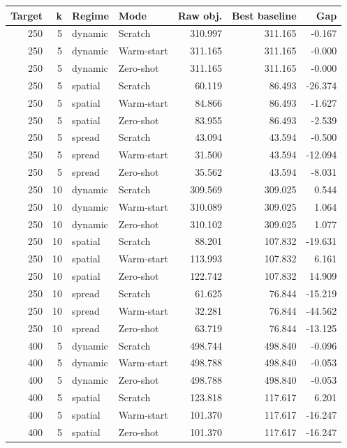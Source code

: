 \begin{tabular}{rrllrrr}
\toprule
Target & k & Regime & Mode & Raw obj. & Best baseline & Gap \\
\midrule
250 & 5 & dynamic & Scratch & 310.997 & 311.165 & -0.167 \\
250 & 5 & dynamic & Warm-start & 311.165 & 311.165 & -0.000 \\
250 & 5 & dynamic & Zero-shot & 311.165 & 311.165 & -0.000 \\
250 & 5 & spatial & Scratch & 60.119 & 86.493 & -26.374 \\
250 & 5 & spatial & Warm-start & 84.866 & 86.493 & -1.627 \\
250 & 5 & spatial & Zero-shot & 83.955 & 86.493 & -2.539 \\
250 & 5 & spread & Scratch & 43.094 & 43.594 & -0.500 \\
250 & 5 & spread & Warm-start & 31.500 & 43.594 & -12.094 \\
250 & 5 & spread & Zero-shot & 35.562 & 43.594 & -8.031 \\
250 & 10 & dynamic & Scratch & 309.569 & 309.025 & 0.544 \\
250 & 10 & dynamic & Warm-start & 310.089 & 309.025 & 1.064 \\
250 & 10 & dynamic & Zero-shot & 310.102 & 309.025 & 1.077 \\
250 & 10 & spatial & Scratch & 88.201 & 107.832 & -19.631 \\
250 & 10 & spatial & Warm-start & 113.993 & 107.832 & 6.161 \\
250 & 10 & spatial & Zero-shot & 122.742 & 107.832 & 14.909 \\
250 & 10 & spread & Scratch & 61.625 & 76.844 & -15.219 \\
250 & 10 & spread & Warm-start & 32.281 & 76.844 & -44.562 \\
250 & 10 & spread & Zero-shot & 63.719 & 76.844 & -13.125 \\
400 & 5 & dynamic & Scratch & 498.744 & 498.840 & -0.096 \\
400 & 5 & dynamic & Warm-start & 498.788 & 498.840 & -0.053 \\
400 & 5 & dynamic & Zero-shot & 498.788 & 498.840 & -0.053 \\
400 & 5 & spatial & Scratch & 123.818 & 117.617 & 6.201 \\
400 & 5 & spatial & Warm-start & 101.370 & 117.617 & -16.247 \\
400 & 5 & spatial & Zero-shot & 101.370 & 117.617 & -16.247 \\

\end{tabular}
